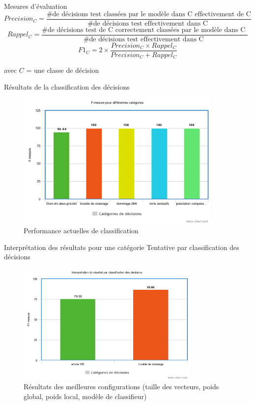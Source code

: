 \documentclass[newPxFont,pagenumber]{beamer}
\begin{document}
\begin{frame}{Mesures d'évaluation}
\scriptsize
\[ Precision_C = \frac{\text{\# de décisions test classées par le modèle dans C effectivement de C}}{\text{\# de décisions test effectivement dans C }} \]
\[ Rappel_C = \frac{\text{\# de décisions test de C correctement classées par le modèle dans C }}{\text{\# de décisions test effectivement dans C }} \]
\[ F1_C = 2 \times \frac{Precision_C \times Rappel_C }{Precision_C + Rappel_C} \]

avec $C$ = une classe de décision

\end{frame}

\begin{frame}{Résultats de la classification des décisions}
\begin{figure}
\includegraphics[width=0.9\textwidth]{f-mesure-classif.png}
\caption{Performance actuelles de classification}
\end{figure}
\end{frame}


\begin{frame}{Interprétation des résultats pour une catégorie}
Tentative par classification des décisions
\begin{figure}
\includegraphics[width=0.8\textwidth]{classifResultat.png}
\caption{Résultats des meilleures configurations (taille des vecteurs, poids global, poids local, modèle de classifieur)}
\end{figure}
\end{frame}
\end{document}
